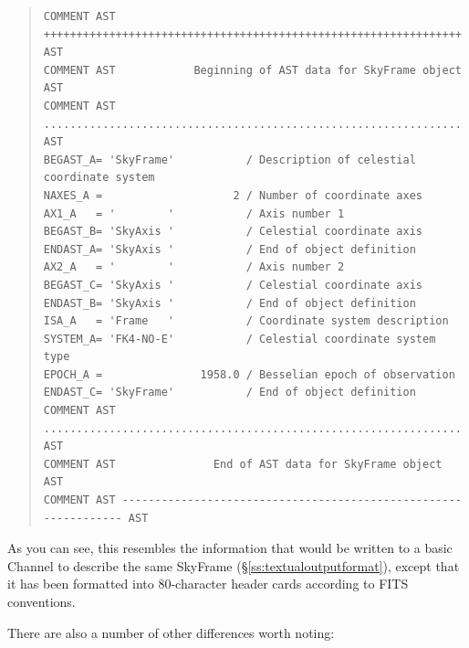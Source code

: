 \documentclass[twoside,11pt]{article}
\newcommand{\secref}[1]{\S\ref{#1}}
\newcommand{\secref}[1]{\ref{#1}}
\begin{document}
\begin{quote}
\small
\begin{verbatim}
COMMENT AST ++++++++++++++++++++++++++++++++++++++++++++++++++++++++++++++++ AST
COMMENT AST            Beginning of AST data for SkyFrame object             AST
COMMENT AST ................................................................ AST
BEGAST_A= 'SkyFrame'           / Description of celestial coordinate system     
NAXES_A =                    2 / Number of coordinate axes                      
AX1_A   = '        '           / Axis number 1                                  
BEGAST_B= 'SkyAxis '           / Celestial coordinate axis                      
ENDAST_A= 'SkyAxis '           / End of object definition                       
AX2_A   = '        '           / Axis number 2                                  
BEGAST_C= 'SkyAxis '           / Celestial coordinate axis                      
ENDAST_B= 'SkyAxis '           / End of object definition                       
ISA_A   = 'Frame   '           / Coordinate system description                  
SYSTEM_A= 'FK4-NO-E'           / Celestial coordinate system type               
EPOCH_A =               1958.0 / Besselian epoch of observation                 
ENDAST_C= 'SkyFrame'           / End of object definition                       
COMMENT AST ................................................................ AST
COMMENT AST               End of AST data for SkyFrame object                AST
COMMENT AST ---------------------------------------------------------------- AST
\end{verbatim}
\normalsize
\end{quote}

As you can see, this resembles the information that would be written
to a basic Channel to describe the same SkyFrame
(\secref{ss:textualoutputformat}), except that it has been formatted
into 80-character header cards according to FITS conventions.

There are also a number of other differences worth noting:
\end{document}
